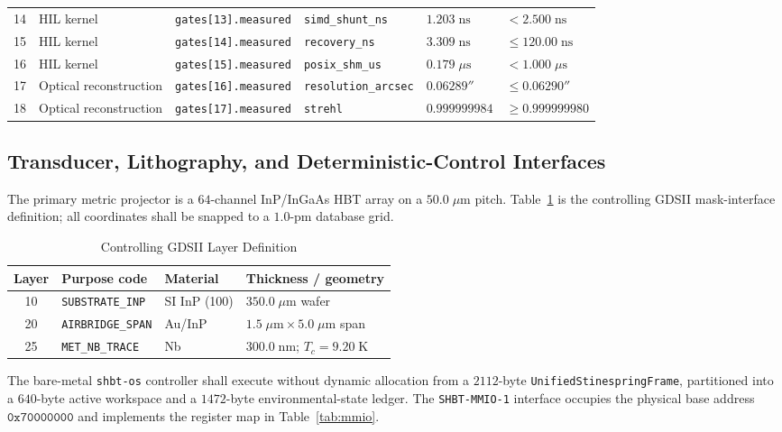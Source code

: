 \documentclass[10pt,twocolumn]{IEEEtran}
\newcommand{\shbtos}{\texttt{shbt-os}}
\begin{document}
\begin{table}[t]
\begin{tabular}{@{}cllllp{2.55cm}@{}}
14 & HIL kernel & \texttt{gates[13].measured} & \texttt{simd\_shunt\_ns} & $1.203\;\mathrm{ns}$ & $<2.500\;\mathrm{ns}$ \\
15 & HIL kernel & \texttt{gates[14].measured} & \texttt{recovery\_ns} & $3.309\;\mathrm{ns}$ & $\leq120.00\;\mathrm{ns}$ \\
16 & HIL kernel & \texttt{gates[15].measured} & \texttt{posix\_shm\_us} & $0.179\;\mu\mathrm{s}$ & $<1.000\;\mu\mathrm{s}$ \\
17 & Optical reconstruction & \texttt{gates[16].measured} & \texttt{resolution\_arcsec} & $0.06289''$ & $\leq0.06290''$ \\
18 & Optical reconstruction & \texttt{gates[17].measured} & \texttt{strehl} & $0.999999984$ & $\geq0.999999980$ \\
\bottomrule
\end{tabular}
\end{table}

\subsection{Transducer, Lithography, and Deterministic-Control Interfaces}

The primary metric projector is a $64$-channel InP/InGaAs HBT array on a $50.0\;\mu\mathrm{m}$ pitch. Table~\ref{tab:gds_stack} is the controlling GDSII mask-interface definition; all coordinates shall be snapped to a $1.0$-pm database grid.

\begin{table}[t]
\caption{Controlling GDSII Layer Definition}
\label{tab:gds_stack}
\centering
\footnotesize
\begin{tabular}{@{}cllp{2.1cm}@{}}
\toprule
Layer & Purpose code & Material & Thickness / geometry \\
\midrule
10 & \texttt{SUBSTRATE\_INP} & SI InP (100) & $350.0\;\mu\mathrm{m}$ wafer \\
20 & \texttt{AIRBRIDGE\_SPAN} & Au/InP & $1.5\;\mu\mathrm{m}\times5.0\;\mu\mathrm{m}$ span \\
25 & \texttt{MET\_NB\_TRACE} & Nb & $300.0\;\mathrm{nm}$; $T_c=9.20\;\mathrm{K}$ \\
\bottomrule
\end{tabular}
\end{table}

The bare-metal \shbtos{} controller shall execute without dynamic allocation from a $2112$-byte \texttt{UnifiedStinespringFrame}, partitioned into a $640$-byte active workspace and a $1472$-byte environmental-state ledger. The \texttt{SHBT-MMIO-1} interface occupies the physical base address $\mathtt{0x70000000}$ and implements the register map in Table~\ref{tab:mmio}.
\end{document}

